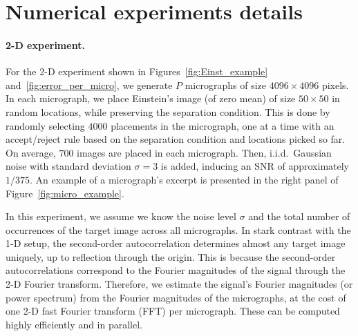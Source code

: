 \documentclass[9pt,twocolumn,twoside,lineno]{pnas-new}
\begin{document}



\appendix

\section{Numerical experiments details} \label{sec:numeric_details}

\paragraph{2-D experiment.}

For the 2-D experiment shown in Figures~\ref{fig:Einst_example} and~\ref{fig:error_per_micro}, we generate $P$ micrographs of size $4096\times 4096$ pixels. 
In each micrograph, we place Einstein's image (of zero mean) of size $50\times 50$  in random locations, while preserving the separation condition.%
This is done by randomly selecting $4000$ placements in the micrograph, one at a time with
an accept/reject rule based on the separation condition and locations picked so far.
On average, $700$ images are placed in each micrograph.   
Then, i.i.d.\ Gaussian noise with standard deviation $\sigma=3$ is added, inducing an SNR of approximately $1/375$.
An example of a micrograph's excerpt is presented in the right panel of Figure~\ref{fig:micro_example}.


In this experiment, we assume we know the noise level $\sigma$ and the total number of occurrences of the target image across all micrographs.
In stark contrast with the 1-D setup, the second-order autocorrelation determines almost any target image uniquely, up to reflection through the origin. This is because the second-order autocorrelations correspond to the Fourier magnitudes of the signal through the 2-D Fourier transform. 
Therefore, we estimate the signal's Fourier magnitudes (or power spectrum) from the Fourier magnitudes of the micrographs, at the cost of one 2-D fast Fourier transform (FFT) per micrograph. These can be computed highly efficiently and in parallel.
\end{document}
